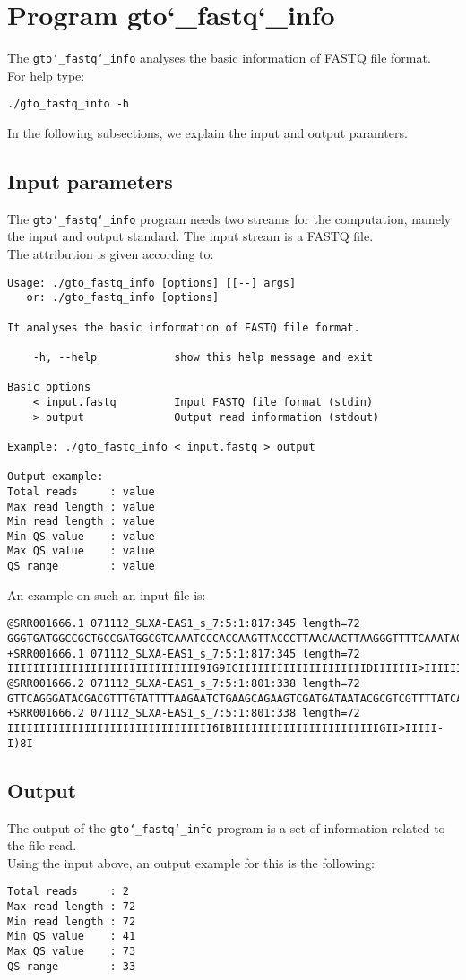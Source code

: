 \section{Program gto\char`_fastq\char`_info}
The \texttt{gto\char`_fastq\char`_info} analyses the basic information of FASTQ file format.\\
For help type:
\begin{lstlisting}
./gto_fastq_info -h
\end{lstlisting}
In the following subsections, we explain the input and output paramters.

\subsection*{Input parameters}

The \texttt{gto\char`_fastq\char`_info} program needs two streams for the computation, namely the input and output standard. The input stream is a FASTQ file.\\
The attribution is given according to:
\begin{lstlisting}
Usage: ./gto_fastq_info [options] [[--] args]
   or: ./gto_fastq_info [options]

It analyses the basic information of FASTQ file format.

    -h, --help            show this help message and exit

Basic options
    < input.fastq         Input FASTQ file format (stdin)
    > output              Output read information (stdout)

Example: ./gto_fastq_info < input.fastq > output

Output example:
Total reads     : value
Max read length : value
Min read length : value
Min QS value    : value
Max QS value    : value
QS range        : value
\end{lstlisting}
An example on such an input file is:
\begin{lstlisting}
@SRR001666.1 071112_SLXA-EAS1_s_7:5:1:817:345 length=72
GGGTGATGGCCGCTGCCGATGGCGTCAAATCCCACCAAGTTACCCTTAACAACTTAAGGGTTTTCAAATAGA
+SRR001666.1 071112_SLXA-EAS1_s_7:5:1:817:345 length=72
IIIIIIIIIIIIIIIIIIIIIIIIIIIIII9IG9ICIIIIIIIIIIIIIIIIIIIIDIIIIIII>IIIIII/
@SRR001666.2 071112_SLXA-EAS1_s_7:5:1:801:338 length=72
GTTCAGGGATACGACGTTTGTATTTTAAGAATCTGAAGCAGAAGTCGATGATAATACGCGTCGTTTTATCAT
+SRR001666.2 071112_SLXA-EAS1_s_7:5:1:801:338 length=72
IIIIIIIIIIIIIIIIIIIIIIIIIIIIIIII6IBIIIIIIIIIIIIIIIIIIIIIIIGII>IIIII-I)8I
\end{lstlisting}

\subsection*{Output}
The output of the \texttt{gto\char`_fastq\char`_info} program is a set of information related to the file read. \\
Using the input above, an output example for this is the following:
\begin{lstlisting}
Total reads     : 2
Max read length : 72
Min read length : 72
Min QS value    : 41
Max QS value    : 73
QS range        : 33
\end{lstlisting}
